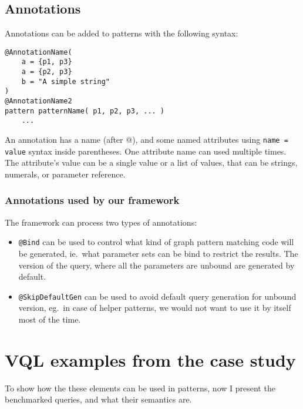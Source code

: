 \subsection{Annotations}

\begin{minipage}{\textwidth}
Annotations can be added to patterns with the following syntax:
\begin{lstlisting}[language=vql]
@AnnotationName(
	a = {p1, p3}
	a = {p2, p3}
	b = "A simple string"
)
@AnnotationName2
pattern patternName( p1, p2, p3, ... )
	...
\end{lstlisting}
\end{minipage}
\vspace{\belowdisplayskip}

An annotation has a name (after @), and some named attributes using \texttt{name = value} syntax inside parentheses.
One attribute name can used multiple times. 
The attribute's value can be a single value or a list of values, that can be strings, numerals, or parameter reference.


\subsubsection{Annotations used by our framework}

The framework can process two types of annotations:
\begin{itemize}
	\item \texttt{@Bind} can be used to control what kind of graph pattern matching code will be generated, ie.\ what parameter sets can be bind to restrict the results. The version of the query, where all the parameters are unbound are generated by default.
	
	\item \texttt{@SkipDefaultGen} can be used to avoid default query generation for unbound version, eg.\ in case of helper patterns, we would not want to use it by itself most of the time.
	
\end{itemize}


\section{VQL examples from the case study}
\label{sec:vql-examples}

To show how the these elements can be used in patterns, now I present the benchmarked queries, and what their semantics are.

